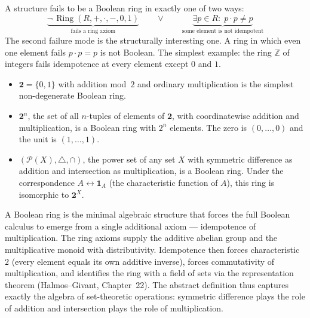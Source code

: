 \begin{remark*}
A structure fails to be a Boolean ring in exactly one of two ways:
\[
\underbrace{\neg\,\operatorname{Ring}(R,+,\cdot,-,0,1)}_{\text{fails a ring axiom}}
\qquad\lor\qquad
\underbrace{\exists p \in R{:}\; p \cdot p \neq p}_{\text{some element is not idempotent}}
\]
The second failure mode is the structurally interesting one.
A ring in which even one element fails $p \cdot p = p$ is not Boolean.
The simplest example: the ring $\mathbb{Z}$ of integers fails
idempotence at every element except $0$ and $1$.
\end{remark*}

\begin{remark*}
\hfill
\begin{itemize}
  \item $\mathbf{2} = \{0,1\}$ with addition mod~$2$ and ordinary
        multiplication is the simplest non-degenerate Boolean ring.
  \item $\mathbf{2}^n$, the set of all $n$-tuples of elements of
        $\mathbf{2}$, with coordinatewise addition and multiplication,
        is a Boolean ring with $2^n$ elements.
        The zero is $(0,\ldots,0)$ and the unit is $(1,\ldots,1)$.
  \item $(\mathcal{P}(X), \triangle, \cap)$, the power set of any
        set $X$ with symmetric difference as addition and intersection
        as multiplication, is a Boolean ring.
        Under the correspondence $A \leftrightarrow \mathbf{1}_A$
        (the characteristic function of $A$), this ring is isomorphic
        to $\mathbf{2}^X$.
\end{itemize}
\end{remark*}

\begin{remark*}[Interpretation]
A Boolean ring is the minimal algebraic structure that forces
the full Boolean calculus to emerge from a single additional
axiom --- idempotence of multiplication.
The ring axioms supply the additive abelian group and the
multiplicative monoid with distributivity.
Idempotence then forces characteristic~$2$ (every element
equals its own additive inverse), forces commutativity of
multiplication, and identifies the ring with a field of sets
via the representation theorem (Halmos--Givant, Chapter~22).
The abstract definition thus captures exactly the algebra of
set-theoretic operations: symmetric difference plays the role
of addition and intersection plays the role of multiplication.
\end{remark*}


